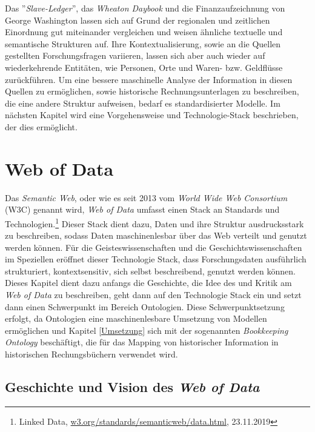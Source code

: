 \documentclass[12pt,a4paper]{article}
\begin{document}
\newpage
Das ''\textit{Slave-Ledger}'', das \textit{Wheaton Daybook} und die Finanzaufzeichnung von George Washington lassen sich auf Grund der regionalen und zeitlichen Einordnung gut miteinander vergleichen und weisen ähnliche textuelle und semantische Strukturen auf. Ihre Kontextualisierung, sowie an die Quellen gestellten Forschungsfragen variieren, lassen sich aber auch wieder auf wiederkehrende Entitäten, wie Personen, Orte und Waren- bzw. Geldflüsse zurückführen. Um eine bessere maschinelle Analyse der Information in diesen Quellen zu ermöglichen, sowie historische Rechnungsunterlagen zu beschreiben, die eine andere Struktur aufweisen, bedarf es standardisierter Modelle. Im nächsten Kapitel wird eine Vorgehensweise und Technologie-Stack beschrieben, der dies ermöglicht.

\newpage
\section{Web of Data}
\label{WebofData}
Das \textit{Semantic Web}, oder wie es seit 2013 vom \textit{World Wide Web Consortium} (W3C) genannt wird, \textit{Web of Data} umfasst einen Stack an Standards und Technologien.\footnote{Linked Data, \url{w3.org/standards/semanticweb/data.html}, 23.11.2019} Dieser Stack dient dazu, Daten und ihre Struktur ausdrucksstark zu beschreiben, sodass Daten maschinenlesbar über das Web verteilt und genutzt werden können. Für die Geisteswissenschaften und die Geschichtswissenschaften im Speziellen eröffnet dieser Technologie Stack, dass Forschungsdaten ausführlich strukturiert, kontextsensitiv, sich selbst beschreibend, genutzt werden können.
\\
Dieses Kapitel dient dazu anfangs die Geschichte, die Idee des und Kritik am \textit{Web of Data} zu beschreiben, geht dann auf den Technologie Stack ein und setzt dann einen Schwerpunkt im Bereich Ontologien. Diese Schwerpunktsetzung erfolgt, da Ontologien eine maschinenlesbare Umsetzung von Modellen ermöglichen und Kapitel \ref{Umsetzung} sich mit der sogenannten \textit{Bookkeeping Ontology} beschäftigt, die für das Mapping von historischer Information in historischen Rechungsbüchern verwendet wird.  

\subsection{Geschichte und Vision des \textit{Web of Data}}
\end{document}
